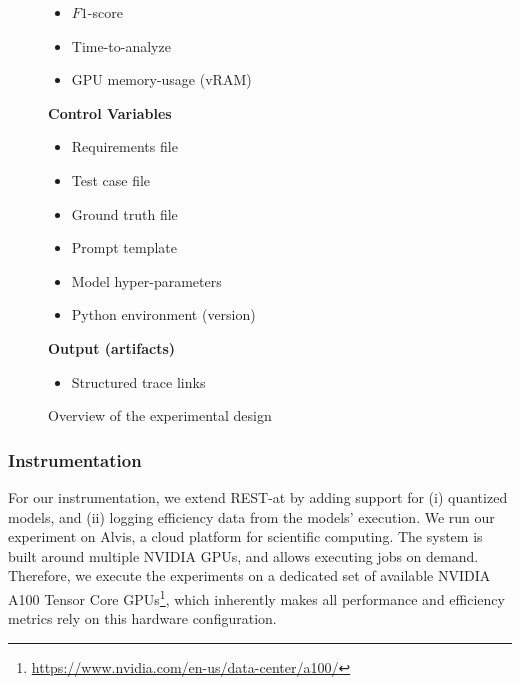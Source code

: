 \documentclass[conference]{IEEEtran}
\begin{document}
\begin{figure}[h]
\begin{center}
\begin{tcbraster}[raster columns=2, raster column skip=5pt, raster equal height=rows, raster row skip=5pt]
\begin{roundedBox}
\begin{itemize}
                \item $F1$-score
                \item Time-to-analyze
                \item GPU memory-usage (vRAM)
            \end{itemize}
        \end{roundedBox}
        \begin{roundedBox}
            \centering 
            \textbf{Control Variables}
            \begin{itemize}
                \item Requirements file
                \item Test case file
                \item Ground truth file
                \item Prompt template
                \item Model hyper-parameters
                \item Python environment (version)
            \end{itemize}
        \end{roundedBox}
        \end{tcbraster}
        \begin{roundedBox}
            \centering
            \textbf{Output (artifacts)}
            \begin{itemize}
            \centering
                \item Structured trace links
            \end{itemize}
        \end{roundedBox}
    \caption{Overview of the experimental design}
    \label{fig:exp-design}
\end{center}
\end{figure}

\subsubsection{Instrumentation}\label{sec:instrumentation}
For our instrumentation, we extend REST-at by adding support for (i) quantized models, and (ii) logging efficiency data from the models' execution. We run our experiment on Alvis, a cloud platform for scientific computing. The system is built around multiple NVIDIA GPUs, and allows executing jobs on demand. Therefore, we execute the experiments on a dedicated set of available NVIDIA A100 Tensor Core GPUs\footnote{\url{https://www.nvidia.com/en-us/data-center/a100/}}, which inherently makes all performance and efficiency metrics rely on this hardware configuration.
\end{document}
